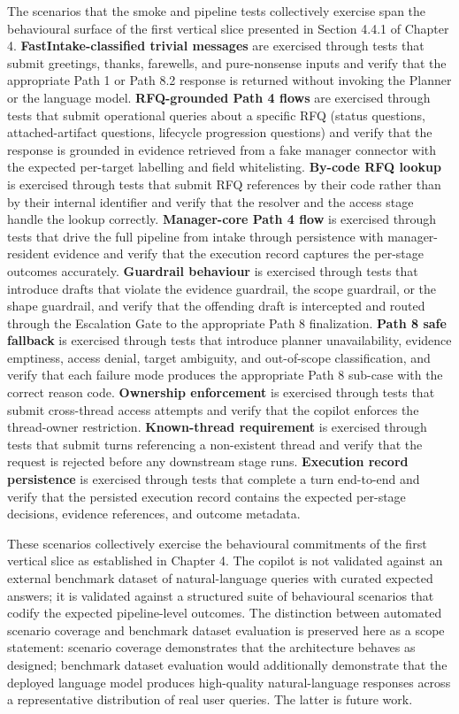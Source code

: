 The scenarios that the smoke and pipeline tests collectively exercise span the behavioural surface of the first vertical slice presented in Section 4.4.1 of Chapter 4. \textbf{FastIntake-classified trivial messages} are exercised through tests that submit greetings, thanks, farewells, and pure-nonsense inputs and verify that the appropriate Path 1 or Path 8.2 response is returned without invoking the Planner or the language model. \textbf{RFQ-grounded Path 4 flows} are exercised through tests that submit operational queries about a specific RFQ (status questions, attached-artifact questions, lifecycle progression questions) and verify that the response is grounded in evidence retrieved from a fake manager connector with the expected per-target labelling and field whitelisting. \textbf{By-code RFQ lookup} is exercised through tests that submit RFQ references by their code rather than by their internal identifier and verify that the resolver and the access stage handle the lookup correctly. \textbf{Manager-core Path 4 flow} is exercised through tests that drive the full pipeline from intake through persistence with manager-resident evidence and verify that the execution record captures the per-stage outcomes accurately. \textbf{Guardrail behaviour} is exercised through tests that introduce drafts that violate the evidence guardrail, the scope guardrail, or the shape guardrail, and verify that the offending draft is intercepted and routed through the Escalation Gate to the appropriate Path 8 finalization. \textbf{Path 8 safe fallback} is exercised through tests that introduce planner unavailability, evidence emptiness, access denial, target ambiguity, and out-of-scope classification, and verify that each failure mode produces the appropriate Path 8 sub-case with the correct reason code. \textbf{Ownership enforcement} is exercised through tests that submit cross-thread access attempts and verify that the copilot enforces the thread-owner restriction. \textbf{Known-thread requirement} is exercised through tests that submit turns referencing a non-existent thread and verify that the request is rejected before any downstream stage runs. \textbf{Execution record persistence} is exercised through tests that complete a turn end-to-end and verify that the persisted execution record contains the expected per-stage decisions, evidence references, and outcome metadata.

These scenarios collectively exercise the behavioural commitments of the first vertical slice as established in Chapter 4. The copilot is not validated against an external benchmark dataset of natural-language queries with curated expected answers; it is validated against a structured suite of behavioural scenarios that codify the expected pipeline-level outcomes. The distinction between automated scenario coverage and benchmark dataset evaluation is preserved here as a scope statement: scenario coverage demonstrates that the architecture behaves as designed; benchmark dataset evaluation would additionally demonstrate that the deployed language model produces high-quality natural-language responses across a representative distribution of real user queries. The latter is future work.

